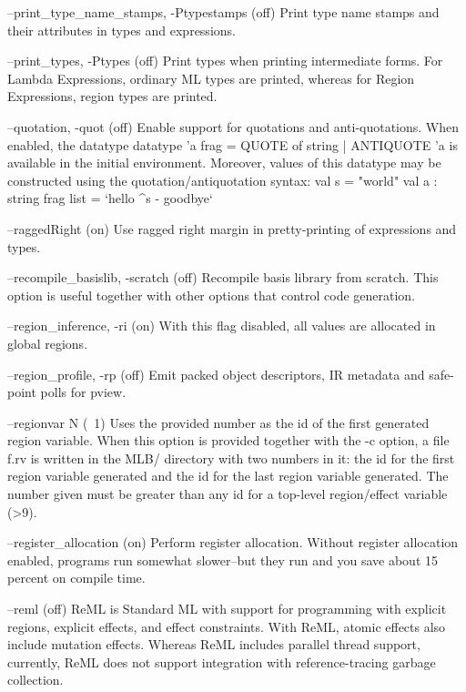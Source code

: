 \documentclass[12pt]{book}
\begin{document}
\begin{scriptcode}
--print_type_name_stamps, -Ptypestamps                   (off)
     Print type name stamps and their attributes in types
     and expressions.

--print_types, -Ptypes                                   (off)
     Print types when printing intermediate forms. For Lambda
     Expressions, ordinary ML types are printed, whereas for
     Region Expressions, region types are printed.

--quotation, -quot                                       (off)
     Enable support for quotations and anti-quotations.
     When enabled, the datatype
        datatype 'a frag = QUOTE of string
                         | ANTIQUOTE 'a
     is available in the initial environment. Moreover,
     values of this datatype may be constructed using
     the quotation/antiquotation syntax:
        val s = "world"
        val a : string frag list = `hello ^s - goodbye`

--raggedRight                                             (on)
     Use ragged right margin in pretty-printing of
     expressions and types.

--recompile_basislib, -scratch                           (off)
     Recompile basis library from scratch. This option
     is useful together with other options that control
     code generation.

--region_inference, -ri                                   (on)
     With this flag disabled, all values are allocated in
     global regions.

--region_profile, -rp                                    (off)
     Emit packed object descriptors, IR metadata and safe-point
     polls for pview.

--regionvar N                                             (~1)
     Uses the provided number as the id of the first
     generated region variable. When this option is
     provided together with the -c option, a file f.rv
     is written in the MLB/ directory with two numbers
     in it: the id for the first region variable
     generated and the id for the last region variable
     generated. The number given must be greater than
     any id for a top-level region/effect variable (>9).

--register_allocation                                     (on)
     Perform register allocation. Without register allocation
     enabled, programs run somewhat slower--but they run and
     you save about 15 percent on compile time.

--reml                                                   (off)
     ReML is Standard ML with support for programming with
     explicit regions, explicit effects, and effect
     constraints. With ReML, atomic effects also include
     mutation effects. Whereas ReML includes parallel
     thread support, currently, ReML does not support
     integration with reference-tracing garbage collection.


\end{scriptcode}
\end{document}
